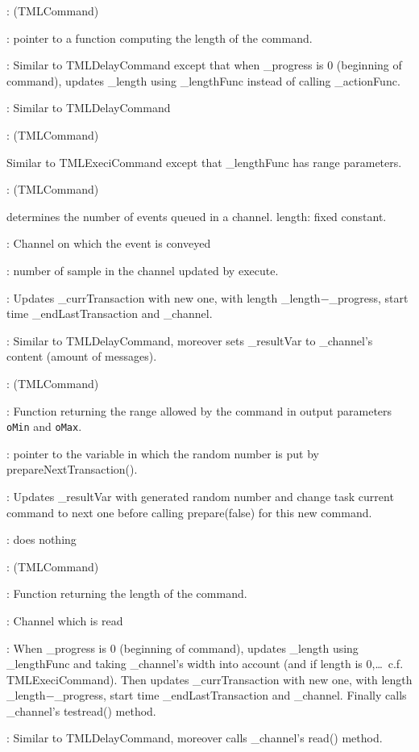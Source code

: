 \documentclass[a4paper,11pt]{article}
\newcommand{\bfont}{\fontseries{b}\selectfont}
\newcommand{\cod}[1]{{\ttfamily #1}}
\newcommand{\class}[2]{\par\vspace{1mm}\hspace{-5mm}\large\colorbox{file}{\textbullet\bfont\cod{#1}:} (\cod{#2})\par}
\newcommand{\method}[1]{\par\vspace{1mm}\hspace{-2mm}\colorbox{method}{\textopenbullet\bfont\cod{#1}:}}
\newcommand{\variable}[1]{\par\vspace{1mm}\hspace{-2mm}\colorbox{variable}{\textopenbullet\bfont\cod{#1}:}}
\begin{document}
\class{TMLExeciCommand}{TMLCommand}
\variable{\_lengthFunc} pointer to a function computing the length of the command.
\method{prepareNextTransaction()} Similar to \cod{TMLDelayCommand} except that when \cod{\_prog\-ress} is 0 (beginning of command), updates \cod{\_length} using \cod{\_lengthFunc} instead of calling \cod{\_actionFunc}.
\method{execute()} Similar to \cod{TMLDelayCommand}

\class{TMLExeciRangeCommand}{TMLCommand}
Similar to \cod{TMLExeciCommand} except that \cod{\_lengthFunc} has range parameters.

\class{TMLNotifiedCommand}{TMLCommand}
determines the number of events queued in a channel. length: fixed constant.
\variable{\_channel} Channel on which the event is conveyed
\variable{\_resultVar} number of sample in the channel updated by \cod{execute}.
\method{prepareNextTransaction()} Updates \cod{\_currTransaction} with new one, with length \cod{\_length}$-$\cod{\_progress}, start time \cod{\_endLastTransaction} and \cod{\_channel}.
\method{execute()} Similar to \cod{TMLDelayCommand}, moreover sets \cod{\_resultVar} to \cod{\_channel}'s content (amount of messages).

\class{TMLRandomCommand}{TMLCommand}
\variable{\_rangeFunc} Function returning the range allowed by the command in output parameters {\tt oMin} and {\tt oMax}.
\variable{*\_resultVar} pointer to the variable in which the random number is put by \cod{prepare\-NextTransaction()}.
\method{prepareNextTransaction()} Updates \cod{\_resultVar} with generated random number and change task current command to next one before calling \cod{prepare(false)} for this new command.
\method{execute()} does nothing

\class{TMLReadCommand}{TMLCommand}
\variable{\_lengthFunc} Function returning the length of the command.
\variable{\_channel} Channel which is read
\method{prepareNextTransaction()} When \cod{\_prog\-ress} is 0 (beginning of command), updates \cod{\_length} using \cod{\_lengthFunc} and taking \cod{\_channel}'s width into account (and if length is 0,\ldots\ c.f. \cod{TMLExeciCommand}). Then updates \cod{\_currTransaction} with new one, with length \cod{\_length}$-$\cod{\_progress}, start time \cod{\_endLastTransaction} and \cod{\_channel}. Finally calls \cod{\_channel}'s \cod{testread()} method.
\method{execute()} Similar to \cod{TMLDelayCommand}, moreover calls \cod{\_channel}'s \cod{read()} method.
\end{document}
